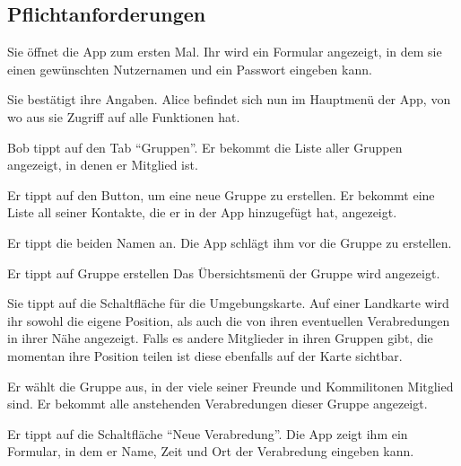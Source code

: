 \documentclass[parskip=full,11pt]{scrartcl}
\begin{document}
\subsection{Pflichtanforderungen}

{Sie öffnet die App zum ersten Mal.}
{Ihr wird ein Formular angezeigt, in dem sie einen gewünschten Nutzernamen
und ein Passwort eingeben kann.}

{Sie bestätigt ihre Angaben.}
{Alice befindet sich nun im Hauptmenü der App, von wo aus sie Zugriff auf alle Funktionen hat.}


{Bob tippt auf den Tab  \enquote{Gruppen}.}
{Er bekommt die Liste aller Gruppen angezeigt, in denen er Mitglied ist.}

{Er tippt auf den Button, um eine neue Gruppe zu erstellen.}
{Er bekommt eine Liste all seiner Kontakte, die er in der App hinzugefügt hat, angezeigt.}

{Er tippt die beiden Namen an.}
{Die App schlägt ihm vor die Gruppe zu erstellen.}

{Er tippt auf Gruppe erstellen}
{Das Übersichtsmenü der Gruppe wird angezeigt.}

{Sie tippt auf die Schaltfläche für die Umgebungskarte.}
{Auf einer Landkarte wird ihr sowohl die eigene Position, als auch die von ihren
eventuellen Verabredungen in ihrer Nähe angezeigt.
Falls es andere Mitglieder in ihren Gruppen gibt, die momentan
ihre Position teilen ist diese ebenfalls auf der Karte sichtbar.}


{Er wählt die Gruppe aus, in der viele seiner Freunde und Kommilitonen Mitglied sind.}
{Er bekommt alle anstehenden Verabredungen dieser Gruppe angezeigt.}

{Er tippt auf die Schaltfläche \enquote{Neue Verabredung}.}
{Die App zeigt ihm ein Formular, in dem er Name, Zeit und Ort der Verabredung eingeben kann.}
\end{document}
